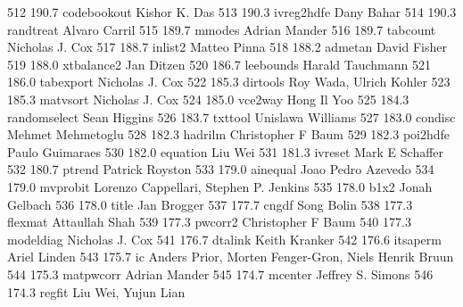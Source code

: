    512    190.7    codebookout   Kishor K. Das                           
   513    190.3    ivreg2hdfe    Dany Bahar                              
   514    190.3    randtreat     Alvaro Carril                           
   515    189.7    mmodes        Adrian Mander                           
   516    189.7    tabcount      Nicholas J. Cox                         
   517    188.7    inlist2       Matteo Pinna                            
   518    188.2    admetan       David Fisher                            
   519    188.0    xtbalance2    Jan Ditzen                              
   520    186.7    leebounds     Harald Tauchmann                        
   521    186.0    tabexport     Nicholas J. Cox                         
   522    185.3    dirtools      Roy Wada, Ulrich Kohler                 
   523    185.3    matvsort      Nicholas J. Cox                         
   524    185.0    vce2way       Hong Il Yoo                             
   525    184.3    randomselect  Sean Higgins                            
   526    183.7    txttool       Unislawa Williams                       
   527    183.0    condisc       Mehmet Mehmetoglu                       
   528    182.3    hadrilm       Christopher F Baum                      
   529    182.3    poi2hdfe      Paulo Guimaraes                         
   530    182.0    equation      Liu Wei                                 
   531    181.3    ivreset       Mark E Schaffer                         
   532    180.7    ptrend        Patrick Royston                         
   533    179.0    ainequal      Joao Pedro Azevedo                      
   534    179.0    mvprobit      Lorenzo Cappellari, Stephen P. Jenkins  
   535    178.0    b1x2          Jonah Gelbach                           
   536    178.0    title         Jan Brogger                             
   537    177.7    cngdf         Song Bolin                              
   538    177.3    flexmat       Attaullah Shah                          
   539    177.3    pwcorr2       Christopher F Baum                      
   540    177.3    modeldiag     Nicholas J. Cox                         
   541    176.7    dtalink       Keith Kranker                           
   542    176.6    itsaperm      Ariel Linden                            
   543    175.7    ic            Anders Prior, Morten Fenger-Gron, Niels 
                                   Henrik Bruun                            
   544    175.3    matpwcorr     Adrian Mander                           
   545    174.7    mcenter       Jeffrey S. Simons                       
   546    174.3    regfit        Liu Wei, Yujun Lian                     
